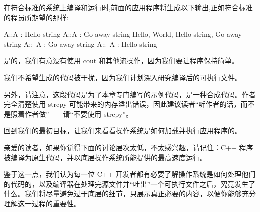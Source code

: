 在符合标准的系统上编译和运行时,前面的应用程序将生成以下输出,正如符合标准的程员所期望的那样:

\begin{shell}
A::A : Hello string
A::A : Go away string
Hello, World, Hello string, Go away string
A::~A : Go away string
A::~A : Hello string
\end{shell}

是的，我们有意没有使用 cout 和其他流操作，因为我们要让程序保持简单。

我们不希望生成的代码被干扰，因为我们计划深入研究编译后的可执行文件。

另外，请注意，这段代码是为了本章专门编写的示例代码，是一种合成代码。作者完全清楚使用 strcpy 可能带来的内存溢出错误，因此建议读者“听作者的话，而不是照着作者做”——请“不要使用 strcpy”。

回到我们的最初目标，让我们来看看操作系统是如何加载并执行应用程序的。

亲爱的读者，如果你觉得下面的讨论层次太低，不太感兴趣，请记住：C++ 程序被编译为原生代码，并以底层操作系统所能提供的最高速度运行。

鉴于这一点，我们认为每一位 C++ 开发者都有必要了解操作系统是如何处理他们的代码的，以及编译器在处理完源文件并“吐出”一个可执行文件之后，究竟发生了什么。我们将尽量避免过于底层的细节，只展示真正必要的内容，以便你能够充分理解这一过程的重要性。












































